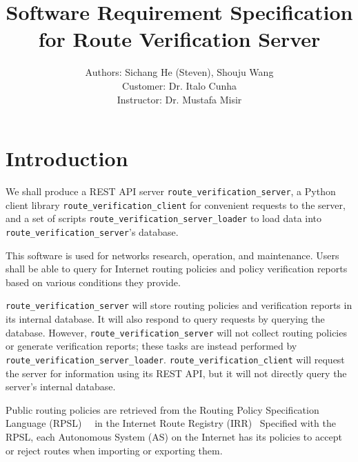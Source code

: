 \documentclass[12pt]{article}
\title{Software Requirement Specification for Route Verification Server}
\author
    {Authors: Sichang He (Steven), Shouju Wang\\
    Customer: Dr. Italo Cunha\\
    Instructor: Dr. Mustafa Misir
}
\begin{document}
\maketitle
\raggedright

\section{Introduction}
We shall produce a REST API server \verb|route_verification_server|,
a Python client library \verb|route_verification_client| for
convenient requests to the server,
and a set of scripts \verb|route_verification_server_loader| to
load data into \verb|route_verification_server|'s database.

This software is used for networks research, operation, and maintenance.
Users shall be able to query for Internet routing policies and
policy verification reports based on various conditions they provide.

\verb|route_verification_server| will store routing policies and
verification reports in its internal database.
It will also respond to query requests by querying the database.
However,
\verb|route_verification_server| will not collect routing policies or
generate verification reports;
these tasks are instead performed by \verb|route_verification_server_loader|.
\verb|route_verification_client| will request the server for information
using its REST API,
but it will not directly query the server's internal database.


Public routing policies are retrieved from
the Routing Policy Specification Language
(RPSL)~\cite{alaettinoglurfc}~\cite{blunk2005rfc} in
the Internet Route Registry (IRR)~\cite{irr2023}
Specified with the RPSL,
each Autonomous System (AS) on the Internet has its policies to
accept or reject routes when importing or exporting them.
\end{document}
